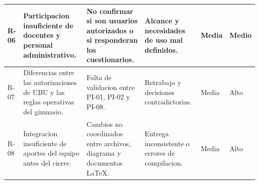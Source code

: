 \begin{longtable}{|p{0.8cm}|p{3.7cm}|p{3.4cm}|p{3.2cm}|p{1.0cm}|p{1.0cm}|}
R-06 & Participacion insuficiente de docentes y personal administrativo. & No confirmar si son usuarios autorizados o si responderan los cuestionarios. & Alcance y necesidades de uso mal definidos. & Media & Medio \\ \hline
R-07 & Diferencias entre las autorizaciones de UBU y las reglas operativas del gimnasio. & Falta de validacion entre PI-01, PI-02 y PI-08. & Retrabajo y decisiones contradictorias. & Media & Alto \\ \hline
R-08 & Integracion insuficiente de aportes del equipo antes del cierre. & Cambios no coordinados entre archivos, diagrama y documentos LaTeX. & Entrega inconsistente o errores de compilacion. & Media & Alto \\ \hline
\end{longtable}
\endgroup

